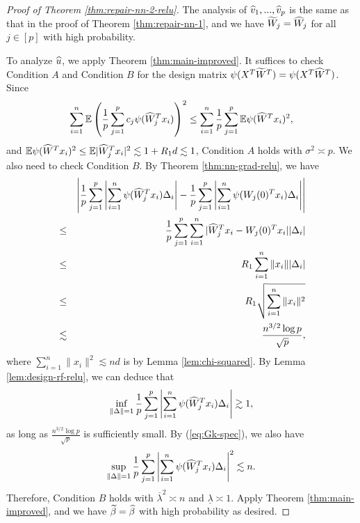 \begin{proof}[Proof of Theorem \ref{thm:repair-nn-2-relu}]
The analysis of $\widehat{v}_1,...,\widehat{v}_p$ is the same as that in the proof of Theorem \ref{thm:repair-nn-1}, and we have $\widetilde{W}_j=\widehat{W}_j$ for all $j\in[p]$ with high probability.

To analyze $\widehat{u}$, we apply Theorem \ref{thm:main-improved}. It suffices to check Condition $A$ and Condition $B$ for the design matrix $\psi(X^T\widetilde{W}^T)=\psi(X^T\widehat{W}^T)$. Since
$$\sum_{i=1}^n\mathbb{E}\left(\frac{1}{p}\sum_{j=1}^pc_j\psi(\widehat{W}_j^Tx_i)\right)^2\leq \sum_{i=1}^n\frac{1}{p}\sum_{j=1}^p\mathbb{E}\psi(\widehat{W}^Tx_i)^2,$$
and $\mathbb{E}\psi(\widehat{W}^Tx_i)^2\leq \mathbb{E}|\widehat{W}_j^Tx_i|^2\lesssim 1 + R_1d\lesssim 1$, Condition $A$ holds with $\sigma^2\asymp p$.
We also need to check Condition $B$. By Theorem \ref{thm:nn-grad-relu}, we have
\begin{eqnarray*}
&& \left|\frac{1}{p}\sum_{j=1}^p\left|\sum_{i=1}^n\psi(\wh{W}_j^Tx_i)\Delta_i\right| - \frac{1}{p}\sum_{j=1}^p\left|\sum_{i=1}^n\psi(W_j(0)^Tx_i)\Delta_i\right|\right| \\
&\leq& \frac{1}{p}\sum_{j=1}^p\sum_{i=1}^n|\wh{W}_j^Tx_i-W_j(0)^Tx_i||\Delta_i| \\
&\leq& R_1\sum_{i=1}^n\|x_i\||\Delta_i| \\
&\leq& R_1\sqrt{\sum_{i=1}^n\|x_i\|^2} \\
&\lesssim& \frac{n^{3/2}\log p}{\sqrt{p}},
\end{eqnarray*}
where $\sum_{i=1}^n\|x_i\|^2\lesssim nd$ is by Lemma \ref{lem:chi-squared}. By Lemma \ref{lem:design-rf-relu}, we can deduce that
$$\inf_{\|\Delta\|=1}\frac{1}{p}\sum_{j=1}^p\left|\sum_{i=1}^n\psi(\widehat{W}_j^Tx_i)\Delta_i\right|\gtrsim 1,$$
as long as $\frac{n^{3/2}\log p}{\sqrt{p}}$ is sufficiently small. By (\ref{eq:Gk-spec}), we also have
$$\sup_{\|\Delta\|=1}\frac{1}{p}\sum_{j=1}^p\left|\sum_{i=1}^n\psi(\widehat{W}_j^Tx_i)\Delta_i\right|^2\lesssim n.$$
Therefore, Condition $B$ holds with $\overline{\lambda}^2\asymp n$ and $\underline{\lambda}\asymp 1$. Apply Theorem \ref{thm:main-improved}, and we have $\widetilde{\beta}=\widehat{\beta}$ with high probability as desired.
\end{proof}
